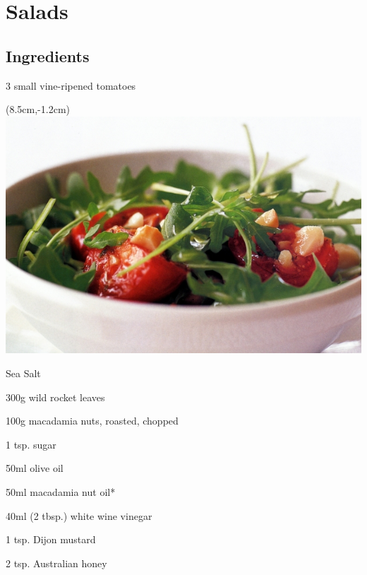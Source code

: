 \chapter{Salads}



\bigskip
\section*{Ingredients}

\begin{ingredients-list}
	\item 3 small vine-ripened tomatoes
		\begin{textblock*}{8cm}(8.5cm,-1.2cm) %
			\includegraphics[scale=0.35]{./img/tomatorocketmacadamia.jpg}
		\end{textblock*}
	\item Sea Salt
	\item 300g wild rocket leaves
	\item 100g macadamia nuts, roasted, chopped
	\item 1 tsp. sugar
	\item 50ml olive oil
	\item 50ml macadamia nut oil*
	\item 40ml (2 tbsp.) white wine vinegar
	\item 1 tsp. Dijon mustard
	\item 2 tsp. Australian honey
\end{ingredients-list}

